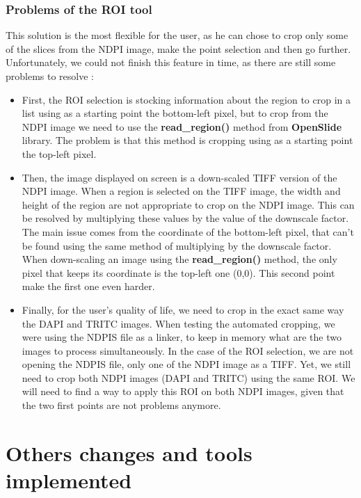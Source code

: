 \documentclass[a4paper,12pt]{report}
\begin{document}
\subsubsection{Problems of the ROI tool}
This solution is the most flexible for the user, as he can chose to crop only some of the slices from the NDPI image, make the point selection and then go further. Unfortunately, we could not finish this feature in time, as there are still some problems to resolve :\vspace{0.2\baselineskip} 
\begin{itemize}
    \item First, the ROI selection is stocking information about the region to crop in a list using as a starting point the bottom-left pixel, but to crop from the NDPI image we need to use the \textbf{read\_region()} method from \textbf{OpenSlide} library. The problem is that this method is cropping using as a starting point the top-left pixel. 
    \item Then, the image displayed on screen is a down-scaled TIFF version of the NDPI image. When a region is selected on the TIFF image, the width and height of the region are not appropriate to crop on the NDPI image. This can be resolved by multiplying these values by the value of the downscale factor. The main issue comes from the coordinate of the bottom-left pixel, that can't be found using the same method of multiplying by the downscale factor. When down-scaling an image using the \textbf{read\_region()} method, the only pixel that keeps its coordinate is the top-left one (0,0). This second point make the first one even harder.
    \item Finally, for the user's quality of life, we need to crop in the exact same way the DAPI and TRITC images. When testing the automated cropping, we were using the NDPIS file as a linker, to keep in memory what are the two images to process simultaneously. In the case of the ROI selection, we are not opening the NDPIS file, only one of the NDPI image as a TIFF. Yet, we still need to crop both NDPI images (DAPI and TRITC) using the same ROI. We will need to find a way to apply this ROI on both NDPI images, given that the two first points are not problems anymore. \\
\end{itemize}


\section{Others changes and tools implemented}
\end{document}
